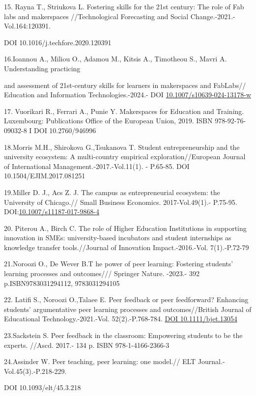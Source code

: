 15. Rayna T., Striukova L. Fostering skills for the 21st century: The
role of Fab labs and makerspaces //Technological Forecasting and Social
Change.-2021.-Vol.164:120391.

DOI 10.1016/j.techfore.2020.120391

16.Ioannou A., Miliou O., Adamou M., Kitsis A., Timotheou S., Mavri A.
Understanding practicing

and assessment of 21st-century skills for learners in makerspaces and
FabLabs// Education and Information Technologies.-2024.- DOI
\href{https://doi.org/10.1007/s10639-024-13178-w}{10.1007/s10639-024-13178-w}

17. Vuorikari R., Ferrari A., Punie Y. Makerspaces for Education and
Training. Luxembourg: Publications Office of the European Union, 2019.
ISBN 978-92-76-09032-8 I DOI 10.2760/946996

18.Morris M.H., Shirokova G.,Tsukanova T. Student entrepreneurship and
the university ecosystem: A multi-country empirical
exploration//European Journal of International
Management.-2017.-Vol.11(1). - P.65-85. DOI 10.1504/EJIM.2017.081251

19.Miller D. J., Acs Z. J. The campus as entrepreneurial ecosystem: the
University of Chicago.// Small Business Economics. 2017-Vol.49(1).-
P.75-95.
DOI:\href{https://link.springer.com/article/10.1007/s11187-017-9868-4}{10.1007/s11187-017-9868-4}

20. Piterou A., Birch C. The role of Higher Education Institutions in
supporting innovation in SMEs: university-based incubators and student
internships as knowledge transfer tools.//Journal of Innovation
Impact.-2016.-Vol. 7(1).-P.72-79

21.Noroozi O., De Wever B.T he power of peer learning: Fostering
students' learning processes and outcomes/// Springer Nature. -2023.-
392 p.ISBN9783031294112, 9783031294105

22. Latifi S., Noroozi O.,Talaee E. Peer feedback or peer feedforward?
Enhancing students' argumentative peer learning processes and
outcomes//British Journal of Educational Technology.-2021.-Vol.
52(2).-P.768-784. \href{https://doi.org/10.1111/bjet.13054}{DOI
10.1111/bjet.13054}

23.Sackstein S. Peer feedback in the classroom: Empowering students to
be the experts. //Ascd. 2017.- 134 p. ISBN 978-1-4166-2366-3

24.Assinder W. Peer teaching, peer learning: one model.// ELT
Journal.-Vol.45(3).-P.218-229.

DOI 10.1093/elt/45.3.218


